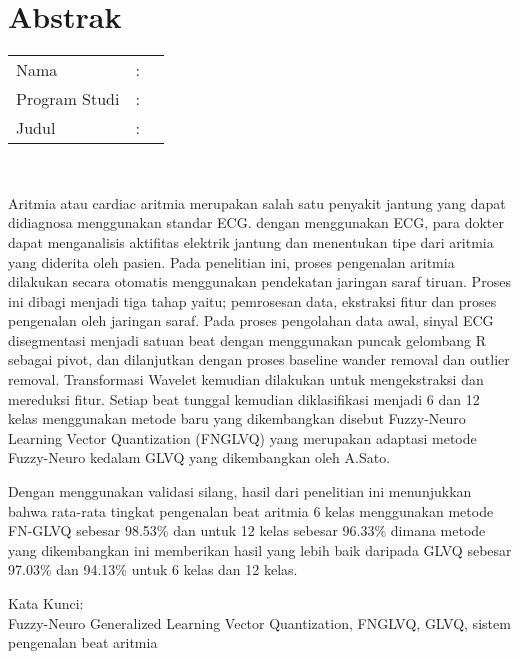 %
%
%

\chapter*{Abstrak}

\vspace*{0.2cm}

\noindent \begin{tabular}{l l p{10cm}}
	Nama&: & \penulis \\
	Program Studi&: & \programstudi \\
	Judul&: & \judul \\
\end{tabular} \\ 

\vspace*{0.5cm}

\noindent

Aritmia atau cardiac aritmia merupakan salah satu penyakit jantung yang dapat
didiagnosa menggunakan standar ECG. dengan menggunakan ECG, para dokter dapat
menganalisis aktifitas elektrik jantung dan menentukan tipe dari aritmia yang
diderita oleh pasien. 
Pada penelitian ini, proses pengenalan aritmia dilakukan secara
otomatis menggunakan pendekatan jaringan saraf tiruan. Proses ini dibagi menjadi
tiga tahap yaitu; pemrosesan data, ekstraksi fitur dan proses pengenalan
oleh jaringan saraf. Pada proses pengolahan data awal, sinyal ECG disegmentasi
menjadi satuan beat dengan menggunakan puncak gelombang R sebagai pivot, dan
dilanjutkan dengan proses baseline wander removal dan outlier removal.
Transformasi Wavelet kemudian dilakukan untuk mengekstraksi dan mereduksi fitur.
Setiap beat tunggal kemudian diklasifikasi menjadi 6 dan 12 kelas menggunakan
metode baru yang dikembangkan disebut Fuzzy-Neuro Learning Vector
Quantization (FNGLVQ) yang merupakan adaptasi metode Fuzzy-Neuro kedalam GLVQ
yang dikembangkan oleh A.Sato. 

Dengan menggunakan validasi silang, hasil dari penelitian ini menunjukkan bahwa
rata-rata tingkat pengenalan beat aritmia 6 kelas menggunakan metode FN-GLVQ
sebesar 98.53\% dan untuk 12 kelas sebesar 96.33\% dimana metode yang
dikembangkan ini memberikan hasil yang lebih baik daripada GLVQ sebesar 97.03\%
dan 94.13\% untuk 6 kelas dan 12 kelas.
\\

\vspace*{0.2cm}

\noindent Kata Kunci: \\ 
\noindent Fuzzy-Neuro Generalized Learning Vector Quantization, FNGLVQ,
GLVQ, sistem pengenalan beat aritmia\\

\newpage